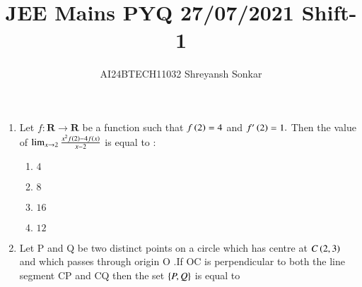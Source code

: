\documentclass[journal]{IEEEtran}
\begin{document}

\vspace{3cm}


\renewcommand{\thefigure}{\theenumi}
\renewcommand{\thetable}{\theenumi}
\setlength{\intextsep}{10pt} %


\renewcommand{\thetable}{\theenumi}

\title{JEE Mains PYQ 27/07/2021 Shift-1}
\author{AI24BTECH11032 Shreyansh Sonkar
}
\maketitle
\renewcommand{\thefigure}{\theenumi}
\renewcommand{\thetable}{\theenumi}
\begin{enumerate}[start=16] %

\item Let $f : \mathbf{R} \to \mathbf{R}$ be a function such that $f\left(2\right)=4$ and $f'\left(2\right)=1.$ Then the value of $\lim_{x \to 2} \frac{x^2 f\left(2\right) - 4 f\left(x\right)}{x - 2}$ is equal to :
\begin{multicols}{4}
    \begin{enumerate}
        \item $4$
        \item $8$
        \item $16$
        \item $12$
    \end{enumerate}
\end{multicols}
\bigskip
\item Let P and Q be two distinct points on a circle which has centre at $C\left(2,3\right)$ and which passes through origin O .If OC is perpendicular to both the line segment CP and CQ then the set $\left\{P,Q\right\}$ is equal to


\end{enumerate}
\end{document}
